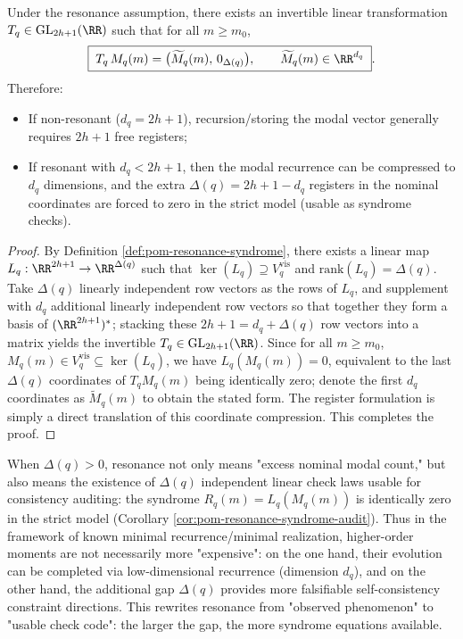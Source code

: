 \begin{corollary}\label{cor:pom-resonance-register-savings}
Under the resonance assumption, there exists an invertible linear transformation \(T_q\in\mathrm{GL}_{2h+1}(\RR)\) such that for all \(m\ge m_0\),
\[
\boxed{\;
T_q\,M_q(m)=\bigl(\widetilde M_q(m),\,0_{\Delta(q)}\bigr),\qquad
\widetilde M_q(m)\in\RR^{d_q}\; }.
\]
Therefore:
\begin{itemize}
  \item If non-resonant (\(d_q=2h+1\)), recursion/storing the modal vector generally requires \(2h+1\) free registers;
  \item If resonant with \(d_q<2h+1\), then the modal recurrence can be compressed to \(d_q\) dimensions, and the extra \(\Delta(q)=2h+1-d_q\) registers in the nominal coordinates are forced to zero in the strict model (usable as syndrome checks).
\end{itemize}
\end{corollary}
\begin{proof}
By Definition \ref{def:pom-resonance-syndrome}, there exists a linear map \(L_q:\RR^{2h+1}\to\RR^{\Delta(q)}\) such that \(\ker(L_q)\supseteq V_q^{\mathrm{vis}}\) and \(\mathrm{rank}(L_q)=\Delta(q)\).
Take \(\Delta(q)\) linearly independent row vectors as the rows of \(L_q\), and supplement with \(d_q\) additional linearly independent row vectors so that together they form a basis of \((\RR^{2h+1})^\ast\); stacking these \(2h+1=d_q+\Delta(q)\) row vectors into a matrix yields the invertible \(T_q\in\mathrm{GL}_{2h+1}(\RR)\).
Since for all \(m\ge m_0\), \(M_q(m)\in V_q^{\mathrm{vis}}\subseteq\ker(L_q)\), we have
\(
L_q(M_q(m))=0
\),
equivalent to the last \(\Delta(q)\) coordinates of \(T_q M_q(m)\) being identically zero; denote the first \(d_q\) coordinates as \(\widetilde M_q(m)\) to obtain the stated form.
The register formulation is simply a direct translation of this coordinate compression. This completes the proof.
\end{proof}

\begin{remark}\label{rem:pom-resonance-as-resource}
When \(\Delta(q)>0\), resonance not only means "excess nominal modal count," but also means the existence of \(\Delta(q)\) independent linear check laws usable for consistency auditing: the syndrome \(R_q(m)=L_q(M_q(m))\) is identically zero in the strict model (Corollary \ref{cor:pom-resonance-syndrome-audit}).
Thus in the framework of known minimal recurrence/minimal realization, higher-order moments are not necessarily more "expensive": on the one hand, their evolution can be completed via low-dimensional recurrence (dimension \(d_q\)), and on the other hand, the additional gap \(\Delta(q)\) provides more falsifiable self-consistency constraint directions.
This rewrites resonance from "observed phenomenon" to "usable check code": the larger the gap, the more syndrome equations available.
\end{remark}

